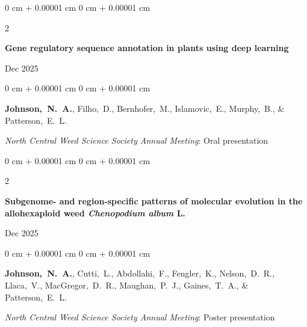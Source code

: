 \documentclass[10pt, letterpaper]{article}
\newenvironment{onecolentry}{
    \begin{adjustwidth}{
        0 cm + 0.00001 cm
    }{
        0 cm + 0.00001 cm
    }
}{
    \end{adjustwidth}
} %
\newenvironment{twocolentry}[2][]{
    \onecolentry
    \def\secondColumn{#2}
    \setcolumnwidth{\fill, 4.5 cm}
    \begin{paracol}{2}
}{
    \switchcolumn \raggedleft \secondColumn
    \end{paracol}
    \endonecolentry
} %
\begin{document}
        \begin{samepage}
            \begin{twocolentry}{
                Dec 2025
                }
                \textbf{Gene regulatory sequence annotation in plants using deep learning}
            \end{twocolentry}

            \vspace{0.10 cm}
            
            \begin{onecolentry}
                \mbox{\textbf{Johnson, N. A.}}, \mbox{Filho, D.}, \mbox{Bernhofer, M.}, \mbox{Islamovic, E.}, \mbox{Murphy, B.}, \& \mbox{Patterson, E. L.}

                \vspace{0.10 cm}
                
                \textit{North Central Weed Science Society Annual Meeting}: Oral presentation
            \end{onecolentry}
        \end{samepage}


        \vspace{0.2 cm}

        
        \begin{samepage}
            \begin{twocolentry}{
                Dec 2025
                }
                \textbf{Subgenome- and region-specific patterns of molecular evolution in the allohexaploid weed \textit{Chenopodium album} L.}
            \end{twocolentry}

            \vspace{0.10 cm}
            
            \begin{onecolentry}
                \mbox{\textbf{Johnson, N. A.}}, \mbox{Cutti, L.}, \mbox{Abdollahi, F.}, \mbox{Fengler, K.}, \mbox{Nelson, D. R.}, \mbox{Llaca, V.}, \mbox{MacGregor, D. R.}, \mbox{Maughan, P. J.}, \mbox{Gaines, T. A.}, \& \mbox{Patterson, E. L.}

                \vspace{0.10 cm}
                
                \textit{North Central Weed Science Society Annual Meeting}: Poster presentation
            \end{onecolentry}
        \end{samepage}
\end{document}

